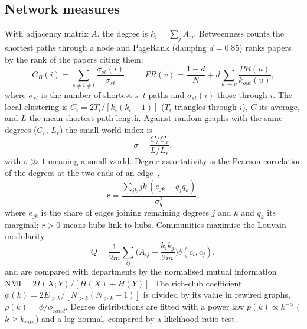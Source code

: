 \documentclass[10pt,twocolumn,a4paper]{article}
\begin{document}
\subsection{Network measures}
With adjacency matrix $A$, the degree is $k_i=\sum_j A_{ij}$. Betweenness counts the shortest paths through a node and PageRank (damping $d=0.85$)
ranks papers by the rank of the papers citing them:
\begin{equation}\label{eq:btw}
C_B(i)=\sum_{s\neq i\neq t}\frac{\sigma_{st}(i)}{\sigma_{st}},\qquad PR(v)=\frac{1-d}{N}+d\!\sum_{u\to v}\frac{PR(u)}{k_{out}(u)},
\end{equation}
where $\sigma_{st}$ is the number of shortest $s$--$t$ paths and $\sigma_{st}(i)$ those through $i$. The local clustering is
$C_i=2T_i/[k_i(k_i-1)]$ ($T_i$ triangles through $i$), $C$ its average, and $L$ the mean shortest-path length. Against random graphs with the same
degrees ($C_r$, $L_r$) the small-world index is
\begin{equation}\label{eq:sigma}
\sigma=\frac{C/C_r}{L/L_r},
\end{equation}
with $\sigma\gg1$ meaning a small world. Degree assortativity is the Pearson correlation of the degrees at the two ends of an edge~\cite{newman2002},
\begin{equation}\label{eq:assort}
r=\frac{\sum_{jk}jk\,(e_{jk}-q_jq_k)}{\sigma_q^{2}},
\end{equation}
where $e_{jk}$ is the share of edges joining remaining degrees $j$ and $k$ and $q_k$ its marginal; $r>0$ means hubs link to hubs. Communities
maximise the Louvain modularity
\begin{equation}\label{eq:mod}
Q=\frac{1}{2m}\sum_{ij}\Big(A_{ij}-\frac{k_ik_j}{2m}\Big)\delta(c_i,c_j),
\end{equation}
and are compared with departments by the normalised mutual information $\mathrm{NMI}=2I(X;Y)/[H(X)+H(Y)]$. The rich-club coefficient
$\phi(k)=2E_{>k}/[N_{>k}(N_{>k}-1)]$ is divided by its value in rewired graphs, $\rho(k)=\phi/\phi_{rand}$. Degree distributions are fitted with a
power law $p(k)\propto k^{-\alpha}$ ($k\geq k_{min}$) and a log-normal, compared by a likelihood-ratio test.
\end{document}
